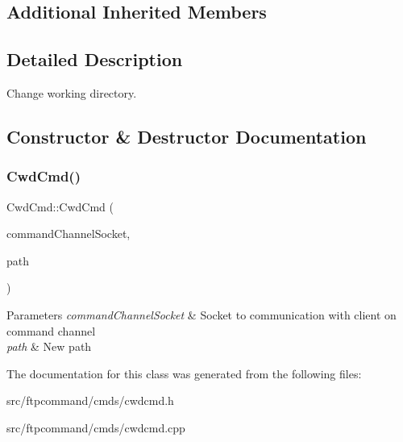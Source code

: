 \subsection*{Additional Inherited Members}


\subsection{Detailed Description}
Change working directory. 

\subsection{Constructor \& Destructor Documentation}
\mbox{\label{classCwdCmd_a625256040d74b4fec013d3a17119dc21}} 
\subsubsection{\texorpdfstring{Cwd\+Cmd()}{CwdCmd()}}
{\footnotesize\ttfamily Cwd\+Cmd\+::\+Cwd\+Cmd (\begin{DoxyParamCaption}\item[{int}]{command\+Channel\+Socket,  }\item[{const Q\+String \&}]{path }\end{DoxyParamCaption})}


\begin{DoxyParams}{Parameters}
{\em command\+Channel\+Socket} & Socket to communication with client on command channel \\
\hline
{\em path} & New path \\
\hline
\end{DoxyParams}


The documentation for this class was generated from the following files\+:\begin{DoxyCompactItemize}
\item 
src/ftpcommand/cmds/cwdcmd.\+h\item 
src/ftpcommand/cmds/cwdcmd.\+cpp\end{DoxyCompactItemize}
